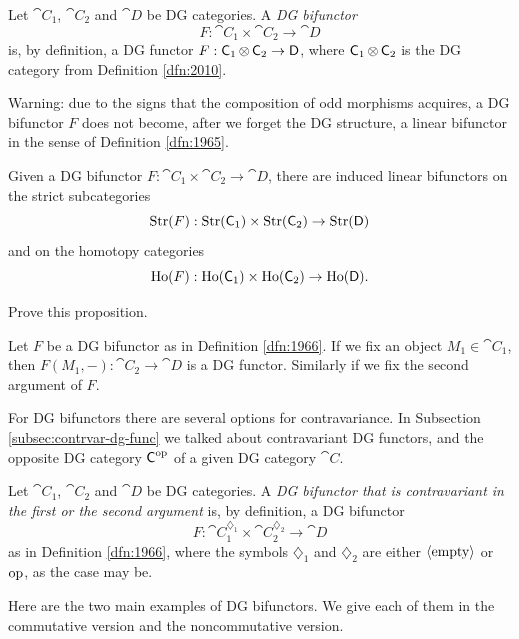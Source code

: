 \begin{dfn} \label{dfn:1966}
Let $\cat{C}_1$, $\cat{C}_2$ and $\cat{D}$ be DG categories. A 
{\em DG bifunctor}%
\[ F : \cat{C}_1 \times \cat{C}_2 \to \cat{D} \]
is, by definition, a DG functor
$F : \operatorname{\mathsf{C}}_1 \otimes \operatorname{\mathsf{C}}_2 \to \operatorname{\mathsf{D}}$,
where $\operatorname{\mathsf{C}}_1 \otimes \operatorname{\mathsf{C}}_2$ is the DG category from Definition
\ref{dfn:2010}. 
\end{dfn}

Warning: due to the signs that the composition of odd morphisms acquires, 
a DG bifunctor $F$ does not become, after we forget the DG structure,
a linear bifunctor in the sense of Definition \ref{dfn:1965}.

\begin{prop} \label{prop:5040}
Given a DG bifunctor
$F : \cat{C}_1 \times \cat{C}_2 \to \cat{D}$, there are induced linear 
bifunctors on the strict subcategories
\[ \operatorname{Str}(F) : \operatorname{Str}(\operatorname{\mathsf{C}}_{1})  \times \operatorname{Str}(\operatorname{\mathsf{C}}_{2}) 
\to  \operatorname{Str}(\operatorname{\mathsf{D}}) \]
and on the homotopy categories
\[ \operatorname{Ho}(F) : \operatorname{Ho}(\operatorname{\mathsf{C}}_{1})  \times \operatorname{Ho}(\operatorname{\mathsf{C}}_{2}) 
\to  \operatorname{Ho}(\operatorname{\mathsf{D}}) . \]
\end{prop}

\begin{exer} \label{exer:5040}
Prove this proposition. 
\end{exer}

Let $F$ be a DG bifunctor as in Definition \ref{dfn:1966}. If we fix an object 
$M_1 \in \cat{C}_{1}$, then 
$F(M_1, -) :  \cat{C}_2 \to \cat{D}$
is a DG functor. Similarly if we fix the second argument of $F$. 

For DG bifunctors there are several options for contravariance. 
In Subsection \ref{subsec:contrvar-dg-func} we talked about contravariant DG 
functors, and the opposite DG category $\operatorname{\mathsf{C}}^{\mathrm{op}}$ of a given DG 
category $\cat{C}$.  

\begin{dfn} \label{dfn:3125}
Let $\cat{C}_1$, $\cat{C}_2$ and $\cat{D}$ be DG categories. A 
{\em DG bifunctor that is contravariant in the first or the second 
argument}%
is, by definition, a DG bifunctor
\[ F : \cat{C}_1^{\diamondsuit_1} \times \cat{C}_2^{\diamondsuit_2} 
\to \cat{D} \]
as in Definition \ref{dfn:1966}, where the symbols $\diamondsuit_1$ and 
$\diamondsuit_2$ are either $\langle \mathrm{empty} \rangle$ or $\operatorname{op}$, as the case may 
be. 
\end{dfn}

Here are the two main examples of DG bifunctors. We give each of them in 
the commutative version and the noncommutative version. 

